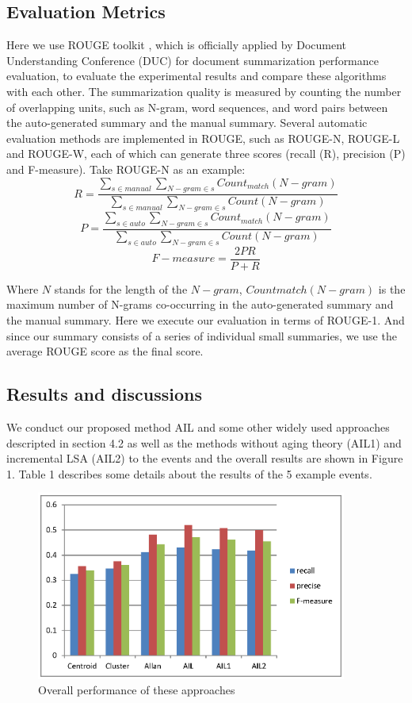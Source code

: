 \documentclass[runningheads,a4paper]{llncs}
\begin{document}
\subsection{Evaluation Metrics}
Here we use ROUGE toolkit \cite{2004-Lin-p74-81} , which is officially applied by Document Understanding Conference (DUC) for document summarization performance evaluation, to evaluate the experimental results and compare these algorithms with each other. The summarization quality is measured by counting the number of overlapping units, such as N-gram, word sequences, and word pairs between the auto-generated summary and the manual summary. Several automatic evaluation methods are implemented in ROUGE, such as ROUGE-N, ROUGE-L and ROUGE-W, each of which can generate three scores (recall (R), precision (P) and F-measure). Take ROUGE-N as an example:
\begin{equation}
R=\frac{\sum_{s \in manual } \sum_{N-gram \in s} Count_{match}(N-gram) } { \sum_{s \in manual} \sum_{N-gram \in s} Count(N-gram)  } \end{equation}
\begin{equation}
P=\frac{\sum_{s \in auto } \sum_{N-gram \in s} Count_{match}(N-gram) } { \sum_{s \in auto} \sum_{N-gram \in s} Count(N-gram)  }
\end{equation}
\begin{equation}
F-measure = \frac{2PR}{P+R}
\end{equation}

Where $N$ stands for the length of the $N-gram$, $Countmatch(N-gram)$ is the maximum number of N-grams co-occurring in the auto-generated summary and the manual summary. Here we execute our evaluation in terms of ROUGE-1. And since our summary consists of a series of individual small summaries, we use the average ROUGE score as the final score.

\subsection{Results and discussions}
We conduct our proposed method AIL and some other widely used approaches descripted in section 4.2 as well as the methods without aging theory (AIL1) and incremental LSA (AIL2) to the events and the overall results are shown in Figure 1. Table 1 describes some details about the results of the 5 example events.
\begin{figure}
\centering
\includegraphics[height=6.2cm]{zhuzhuangtu}
\caption{Overall performance of these approaches}
\label{fig:zhuzhuangtu}
\end{figure}
\end{document}
